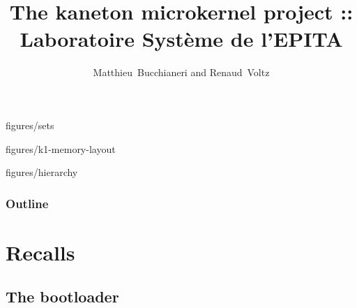 %
%
%
%
%
%

%
%

%
%

\def\path{../../..}

%
%



%
%

\title{The kaneton microkernel project :: Laboratoire Syst\`eme de l'EPITA}

%
%

\author
{
  Matthieu~Bucchianeri and Renaud~Voltz
}

%
%

		{figures/sets}

		{figures/k1-memory-layout}

		{figures/hierarchy}

%
%



%
%

\begin{frame}
  \titlepage
\end{frame}

%
%

\begin{frame}
  \frametitle{Outline}
  \tableofcontents
\end{frame}

%
%

\section{Recalls}

%
%

\subsection{The bootloader}


